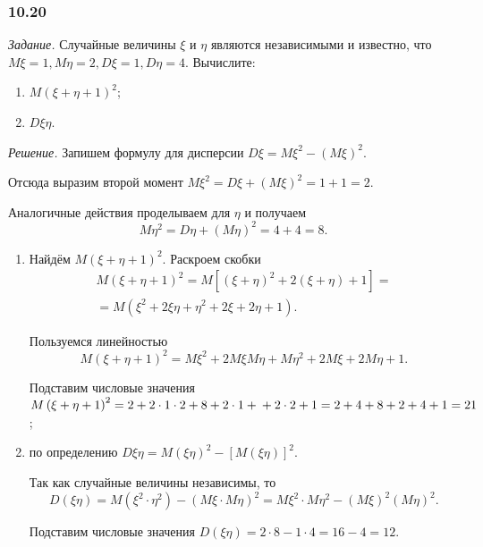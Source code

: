 \subsubsection*{10.20}

\textit{Задание.} Случайные величины $ \xi $ и $ \eta $ являются независимыми и известно, что $M \xi = 1, M \eta = 2, D \xi = 1, D \eta = 4$.
Вычислите:
\begin{enumerate}[label=\alph*)]
\item $M \left( \xi + \eta + 1 \right)^2$;
\item $D \xi \eta $.
\end{enumerate}

\textit{Решение.} Запишем формулу для дисперсии $D \xi = M \xi^2 - \left( M \xi \right)^2$.

Отсюда выразим второй момент $M \xi^2 = D \xi + \left( M \xi \right)^2 = 1 + 1 = 2$.

Аналогичные действия проделываем для $ \eta $ и получаем
$$M \eta^2 =
D \eta + \left( M \eta \right)^2 =
4 + 4 =
8.$$

\begin{enumerate}[label=\alph*)]
\item Найдём $M \left( \xi + \eta + 1 \right)^2$.
Раскроем скобки
\begin{equation*}
\begin{split}
M \left( \xi + \eta + 1 \right)^2 =
M \left[ \left( \xi + \eta \right)^2 + 2 \left( \xi + \eta \right) + 1 \right] = \\
= M \left( \xi^2 + 2 \xi \eta + \eta^2 + 2 \xi + 2 \eta + 1 \right).
\end{split}
\end{equation*}

Пользуемся линейностью
$$M \left( \xi + \eta + 1 \right)^2 =
M \xi^2 + 2 M \xi M \eta + M \eta^2 + 2M \xi + 2M \eta + 1.$$

Подставим числовые значения $M \left( \xi + \eta + 1 \right)^2 = 2 + 2 \cdot 1 \cdot 2 + 8 + 2 \cdot 1 + \\
+ 2 \cdot 2 + 1 = 2 + 4 + 8 + 2 + 4 + 1 = 21$;
\item по определению $D \xi \eta = M \left( \xi \eta \right)^2 - \left[ M \left( \xi \eta \right) \right]^2$.

Так как случайные величины независимы, то
$$D \left( \xi \eta \right) =
M \left( \xi^2 \cdot \eta^2 \right) - \left( M \xi \cdot M \eta \right)^2 =
M \xi^2 \cdot M \eta^2 - \left( M \xi \right)^2 \left( M \eta \right)^2.$$

Подставим числовые значения $D \left( \xi \eta \right) = 2 \cdot 8 - 1 \cdot 4 = 16 - 4 = 12$.
\end{enumerate}
